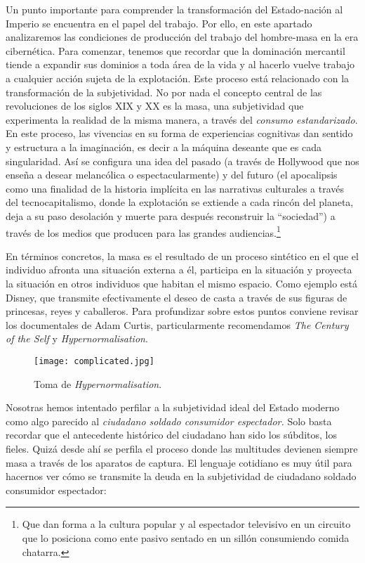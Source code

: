 Un punto importante para comprender la transformación del Estado-nación al Imperio se encuentra en el papel del trabajo. Por ello, en este apartado analizaremos las condiciones de producción del trabajo del hombre-masa en la era cibernética. Para comenzar, tenemos que recordar que la dominación mercantil tiende a expandir sus dominios a toda área de la vida y al hacerlo vuelve trabajo a cualquier acción sujeta de la explotación. Este proceso está relacionado con la transformación de la subjetividad. No por nada el concepto central de las revoluciones de los siglos XIX y XX es la masa, una subjetividad que experimenta la realidad de la misma manera, a través del \emph{consumo estandarizado}. En este proceso, las vivencias en su forma de experiencias cognitivas dan sentido y estructura a la imaginación, es decir a la máquina deseante que es cada singularidad. Así se configura una idea del pasado (a través de Hollywood que nos enseña a desear melancólica o espectacularmente) y del futuro (el apocalipsis como una finalidad de la historia implícita en las narrativas culturales a través del tecnocapitalismo, donde la explotación se extiende a cada rincón del planeta, deja a su paso desolación y muerte para después reconstruir la \enquote{sociedad}\revquotes{}) a través de los medios que producen para las grandes audiencias.\footnote{Que dan forma a la cultura popular y al espectador televisivo en un circuito que lo posiciona como ente pasivo sentado en un sillón consumiendo comida chatarra.}

En términos concretos, la masa es el resultado de un proceso sintético en el que el individuo afronta una situación externa a él, participa en la situación y proyecta la situación en otros individuos que habitan el mismo espacio. Como ejemplo está Disney, que transmite efectivamente el deseo de casta a través de sus figuras de princesas, reyes y caballeros. Para profundizar sobre estos puntos conviene revisar los documentales de Adam Curtis, particularmente recomendamos \emph{The Century of the Self} y \emph{Hypernormalisation}.

\begin{figure}[htbp]
	\centering
	\texttt{[image: complicated.jpg]}
	\caption[\emph{Hypernormalisation}]{Toma de \emph{Hypernormalisation}.}
	\label{fig:hypernormalisation}
\end{figure}

Nosotras hemos intentado perfilar a la subjetividad ideal del Estado moderno como algo parecido al \emph{ciudadano soldado consumidor espectador.} Solo basta recordar que el antecedente histórico del ciudadano han sido los súbditos, los fieles. Quizá desde ahí se perfila el proceso donde las multitudes devienen siempre masa a través de los aparatos de captura. El lenguaje cotidiano es muy útil para hacernos ver cómo se transmite la deuda en la subjetividad de ciudadano soldado consumidor espectador:

